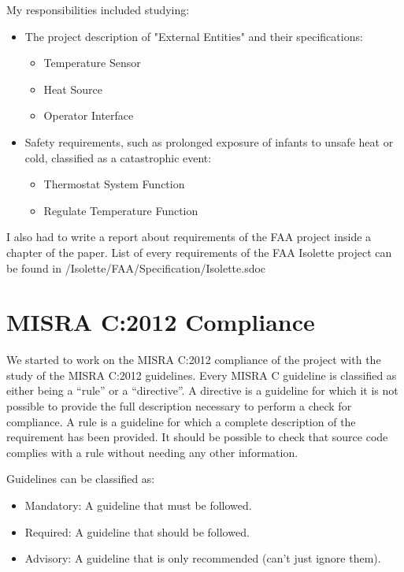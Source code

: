 \documentclass[a4paper, 12pt]{article}
\begin{document}
My responsibilities included studying:

\begin{itemize}
    \item The project description of "External Entities" and their specifications:
    \begin{itemize}
        \item Temperature Sensor
        \item Heat Source
        \item Operator Interface
    \end{itemize}
    \item Safety requirements, such as prolonged exposure of infants to unsafe heat or cold, classified as a catastrophic event:
    \begin{itemize}
        \item Thermostat System Function
        \item Regulate Temperature Function
    \end{itemize}
\end{itemize}

I also had to write a report about requirements of the FAA project inside a chapter of the paper.
List of every requirements of the FAA Isolette project can be found in /Isolette/FAA/Specification/Isolette.sdoc

\section{MISRA C:2012 Compliance}

We started to work on the MISRA C:2012 compliance of the project with the study of the MISRA C:2012 guidelines.
Every MISRA C guideline is classified as either being a “rule” or a “directive”.
A directive is a guideline for which it is not possible to provide the full description necessary to perform a check for compliance.
A rule is a guideline for which a complete description of the requirement has been provided. 
It should be possible to check that source code complies with a rule without needing any other information.

Guidelines can be classified as:
\begin{itemize}
    \item Mandatory: A guideline that must be followed.
    \item Required: A guideline that should be followed.
    \item Advisory: A guideline that is only recommended (can't just ignore them).
\end{itemize}
\end{document}
